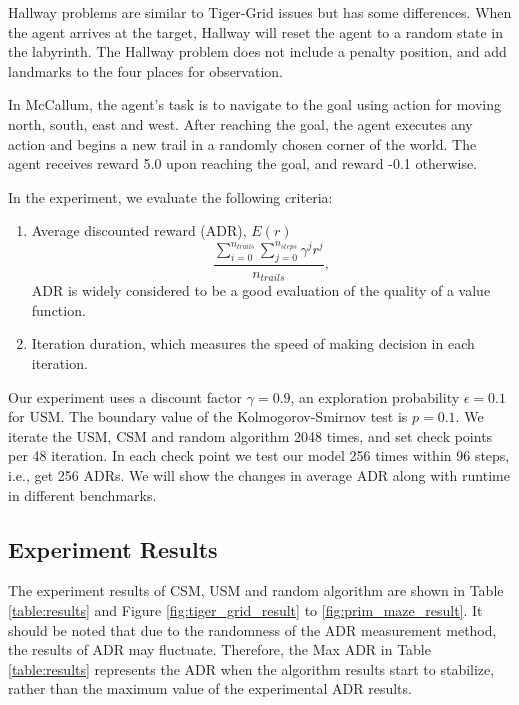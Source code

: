 \documentclass{article}
\begin{document}
Hallway problems are similar to Tiger-Grid issues but has some differences. When the agent
arrives at the target, Hallway will reset the agent to a random state in the labyrinth.
The Hallway problem does not include a penalty position, and add landmarks to the four places
for observation.

In McCallum, the agent’s task is to navigate to the goal using action for moving north,
south, east and west. After reaching the goal, the agent executes any action and begins a new
trail in a randomly chosen corner of the world. The agent receives reward 5.0 upon reaching
the goal, and reward -0.1 otherwise.

In the experiment, we evaluate the following criteria:

\begin{enumerate}
  \item Average discounted reward (ADR), $E(r)$
  \begin{equation}
    \frac{\sum_{i=0}^{n_{trails}} \sum_{j=0}^{n_{steps}} \gamma^j r^j}{n_{trails}},
  \end{equation}
  ADR is widely considered to be a good evaluation of the quality of a value function.
  
  \item Iteration duration, which measures the speed of making decision in each iteration.
\end{enumerate}

Our experiment uses a discount factor $\gamma=0.9$, an exploration probability $\epsilon=0.1$ for USM.
The boundary value of the Kolmogorov-Smirnov test is $p=0.1$. We iterate the USM, CSM and random algorithm
2048 times, and set check points per 48 iteration. In each check point we test our model 256 times
within 96 steps, i.e., get 256 ADRs. We will show the changes in average ADR along with runtime in
different benchmarks.

\subsection{Experiment Results}

The experiment results of CSM, USM and random algorithm are shown in  Table \ref{table:results} and Figure  \ref{fig:tiger_grid_result} to \ref{fig:prim_maze_result}. It should be noted that due to the randomness of the ADR measurement method, the results of ADR may fluctuate. Therefore, the Max ADR in Table \ref{table:results}  represents the ADR when the algorithm results start to stabilize, rather than the maximum value of the experimental ADR results.
\end{document}
